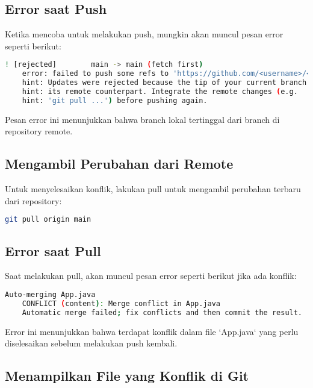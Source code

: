 \subsection{Error saat Push}

Ketika mencoba untuk melakukan push, mungkin akan muncul pesan error seperti berikut:

\begin{lstlisting}[language=bash]
	! [rejected]        main -> main (fetch first)
	error: failed to push some refs to 'https://github.com/<username>/<nama-repository>.git'
	hint: Updates were rejected because the tip of your current branch is behind
	hint: its remote counterpart. Integrate the remote changes (e.g.
	hint: 'git pull ...') before pushing again.
\end{lstlisting}

Pesan error ini menunjukkan bahwa branch lokal tertinggal dari branch di repository remote.

\subsection{Mengambil Perubahan dari Remote}

Untuk menyelesaikan konflik, lakukan pull untuk mengambil perubahan terbaru dari repository:

\begin{lstlisting}[language=bash]
	git pull origin main
\end{lstlisting}

\subsection{Error saat Pull}

Saat melakukan pull, akan muncul pesan error seperti berikut jika ada konflik:

\begin{lstlisting}[language=bash]
	Auto-merging App.java
	CONFLICT (content): Merge conflict in App.java
	Automatic merge failed; fix conflicts and then commit the result.
\end{lstlisting}

Error ini menunjukkan bahwa terdapat konflik dalam file `App.java` yang perlu diselesaikan sebelum melakukan push kembali.


\subsection{Menampilkan File yang Konflik di Git}

